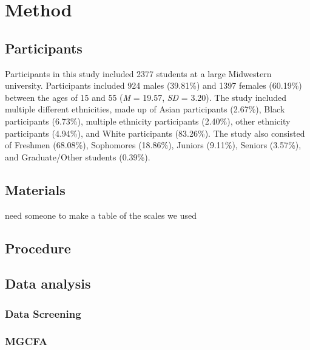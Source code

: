 \documentclass[man,draftall]{apa6}
\begin{document}
\hypertarget{method}{%
\section{Method}\label{method}}

\hypertarget{participants}{%
\subsection{Participants}\label{participants}}

Participants in this study included 2377 students at a large Midwestern university. Participants included 924 males (39.81\%) and 1397 females (60.19\%) between the ages of 15 and 55 (\emph{M} = 19.57, \emph{SD} = 3.20). The study included multiple different ethnicities, made up of Asian participants (2.67\%), Black participants (6.73\%), multiple ethnicity participants (2.40\%), other ethnicity participants (4.94\%), and White participants (83.26\%). The study also consisted of Freshmen (68.08\%), Sophomores (18.86\%), Juniors (9.11\%), Seniors (3.57\%), and Graduate/Other students (0.39\%).

\hypertarget{materials}{%
\subsection{Materials}\label{materials}}

need someone to make a table of the scales we used

\hypertarget{procedure}{%
\subsection{Procedure}\label{procedure}}

\hypertarget{data-analysis}{%
\subsection{Data analysis}\label{data-analysis}}

\hypertarget{data-screening}{%
\subsubsection{Data Screening}\label{data-screening}}

\hypertarget{mgcfa}{%
\subsubsection{MGCFA}\label{mgcfa}}
\end{document}
